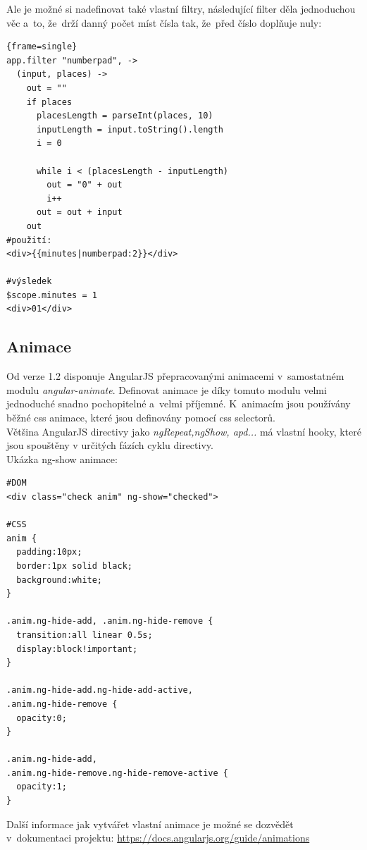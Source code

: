 \documentclass[a4paper,12pt,twoside,BCOR=10mm]{article}
\renewcommand{\it}[1]{\textit{#1}}    %
\newenvironment{codeframe}{%
  \begin{Sbox} 
    \begin{minipage} 
      {\columnwidth-\leftmargin-\rightmargin-2\fboxsep-2\fboxrule-4pt} 
}{%

  \end{minipage} 
  \end{Sbox} 
  \begin{center} 
    \fcolorbox{black}{codeback}{\TheSbox} 
  \end{center} 
}
\begin{document}
Ale je možné si nadefinovat také vlastní filtry, následující filter děla jednoduchou věc a~to, že~drží danný počet míst čísla tak, že~před číslo doplňuje nuly:
     \begin{codeframe} 
      \begin{Verbatim}{frame=single}
app.filter "numberpad", ->
  (input, places) ->
    out = ""
    if places
      placesLength = parseInt(places, 10)
      inputLength = input.toString().length
      i = 0

      while i < (placesLength - inputLength)
        out = "0" + out
        i++
      out = out + input
    out
#použití:
<div>{{minutes|numberpad:2}}</div>

#výsledek
$scope.minutes = 1
<div>01</div>
\end{Verbatim} 
    \end{codeframe}

\subsection{Animace}
Od verze 1.2 disponuje AngularJS přepracovanými animacemi v~samostatném modulu \it{angular-animate}. Definovat animace je díky tomuto modulu velmi jednoduché snadno pochopitelné a~velmi příjemné. K~animacím jsou používány běžné css animace, které jsou definovány pomocí css selectorů. \cite{angularAnimation}\\

Většina AngularJS directivy jako \it{ngRepeat,ngShow, apd...} má vlastní hooky, které jsou spouštěny v určitých fázích cyklu directivy.\\

Ukázka ng-show animace:
\begin{codeframe}
  \begin{verbatim}
#DOM
<div class="check anim" ng-show="checked">

#CSS
anim {
  padding:10px;
  border:1px solid black;
  background:white;
}

.anim.ng-hide-add, .anim.ng-hide-remove {
  transition:all linear 0.5s;
  display:block!important;
}

.anim.ng-hide-add.ng-hide-add-active,
.anim.ng-hide-remove {
  opacity:0;
}

.anim.ng-hide-add,
.anim.ng-hide-remove.ng-hide-remove-active {
  opacity:1;
}
  \end{verbatim}
\end{codeframe}

Další informace jak vytvářet vlastní animace je možné se dozvědět v~dokumentaci projektu: \href{https://docs.angularjs.org/guide/animations}{https://docs.angularjs.org/guide/animations}\\
\end{document}
